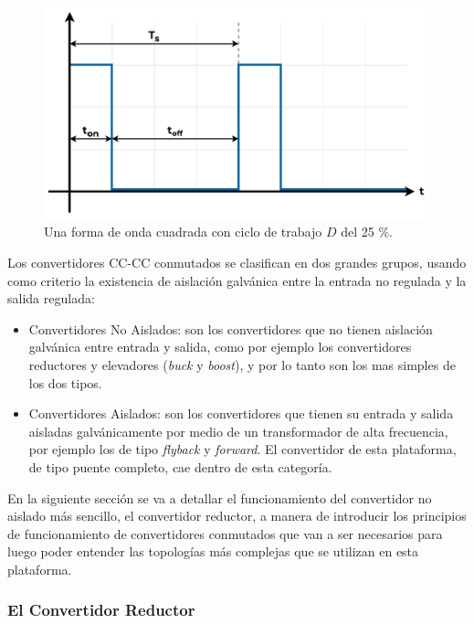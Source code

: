 \begin{figure}[h]
    \centering
    \includegraphics[scale=0.5]{Imagenes/Duty Cycle.pdf}
    \caption{Una forma de onda cuadrada con ciclo de trabajo $D$ del 25 \%.}
    \label{dutycycle}
\end{figure}

Los convertidores CC-CC conmutados se clasifican en dos grandes grupos, usando como criterio la existencia de aislación galvánica entre la entrada no regulada y la salida regulada:

\begin{itemize}
    \item {\SemiBold Convertidores No Aislados:} son los convertidores que no tienen aislación galvánica entre entrada y salida, como por ejemplo los convertidores reductores y elevadores (\textit{buck} y \textit{boost}), y por lo tanto son los mas simples de los dos tipos.
    \item {\SemiBold Convertidores Aislados:} son los convertidores que tienen su entrada y salida aisladas galvánicamente por medio de un transformador de alta frecuencia, por ejemplo los de tipo \textit{flyback} y \textit{forward}. El convertidor de esta plataforma, de tipo puente completo, cae dentro de esta categoría.
\end{itemize}

En la siguiente sección se va a detallar el funcionamiento del convertidor no aislado más sencillo, el convertidor reductor, a manera de introducir los principios de funcionamiento de convertidores conmutados que van a ser necesarios para luego poder entender las topologías más complejas que se utilizan en esta plataforma.\\

\subsubsection{El Convertidor Reductor}

